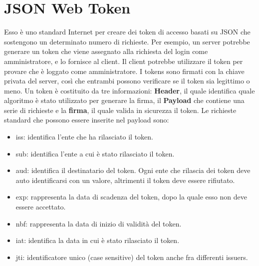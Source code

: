 \section{JSON Web Token}
Esso è uno standard Internet per creare dei token di accesso basati su JSON che sostengono un determinato numero di richieste. Per esempio, un server potrebbe generare un token che viene assegnato alla richiesta del login come amministratore, e lo fornisce al client. Il client potrebbe utilizzare il token per provare che è loggato come amministratore. I tokens sono firmati con la chiave privata del server, così che entrambi possono verificare se il token sia legittimo o meno. Un token è costituito da tre informazioni: \textbf{Header}, il quale identifica quale algoritmo è stato utilizzato per generare la firma, il \textbf{Payload} che contiene una serie di richieste e la \textbf{firma}, il quale valida in sicurezza il token. Le richieste standard che possono essere inserite nel payload sono:
\begin{itemize}
    \item iss: identifica l'ente che ha rilasciato il token.
    \item sub: identifica l'ente a cui è stato rilasciato il token.
    \item aud: identifica il destinatario del token. Ogni ente che rilascia dei token deve auto identificarsi con un valore, altrimenti il token deve essere rifiutato.
    \item exp: rappresenta la data di scadenza del token, dopo la quale esso non deve essere accettato.
    \item nbf: rappresenta la data di inizio di validità del token.
    \item iat: identifica la data in cui è stato rilasciato il token.
    \item jti: identificatore unico (case sensitive) del token anche fra differenti issuers.
\end{itemize}
